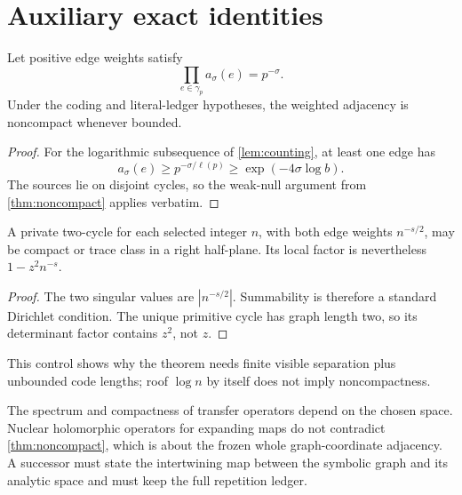 \section{Auxiliary exact identities}

\begin{proposition}
Let positive edge weights satisfy
\[
  \prod_{e\in\gamma_p}a_\sigma(e)=p^{-\sigma}.
\]
Under the coding and literal-ledger hypotheses, the weighted adjacency is
noncompact whenever bounded.
\end{proposition}

\begin{proof}
For the logarithmic subsequence of \cref{lem:counting}, at least one edge
has
\[
 a_\sigma(e)\ge p^{-\sigma/\ell(p)}
 \ge \exp(-4\sigma\log b).
\]
The sources lie on disjoint cycles, so the weak-null argument from
\cref{thm:noncompact} applies verbatim.
\end{proof}

\begin{proposition}
A private two-cycle for each selected integer $n$, with both edge weights
$n^{-s/2}$, may be compact or trace class in a right half-plane.  Its local
factor is nevertheless $1-z^2n^{-s}$.
\end{proposition}

\begin{proof}
The two singular values are $|n^{-s/2}|$.  Summability is therefore a
standard Dirichlet condition.  The unique primitive cycle has graph length
two, so its determinant factor contains $z^2$, not $z$.
\end{proof}

This control shows why the theorem needs finite visible separation plus
unbounded code lengths; roof $\log n$ by itself does not imply
noncompactness.

\begin{remark}
The spectrum and compactness of transfer operators depend on the chosen
space.  Nuclear holomorphic operators for expanding maps
\citep{mayer1990} do not contradict \cref{thm:noncompact}, which is about the
frozen whole graph-coordinate adjacency.  A successor must state the
intertwining map between the symbolic graph and its analytic space and must
keep the full repetition ledger.
\end{remark}

